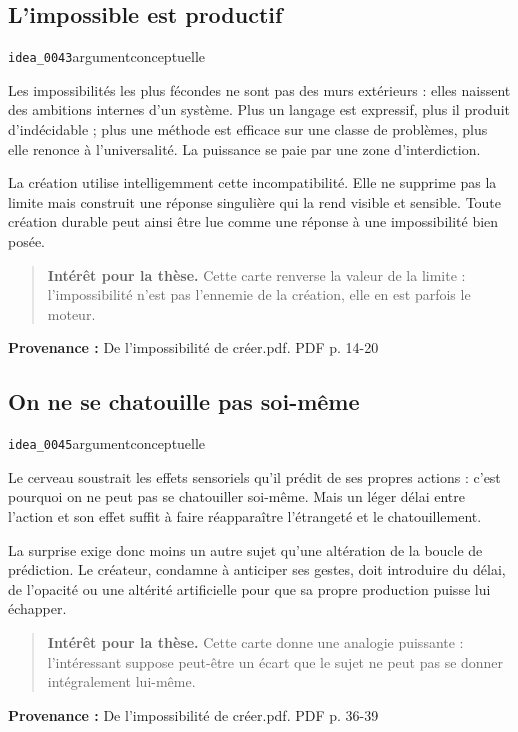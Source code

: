 \documentclass[10pt,a4paper]{article}
\begin{document}
\subsection{L'impossible est productif}
{\small\color{metadata} \texttt{idea\_0043}\quad\textbullet\quad argument\quad\textbullet\quad conceptuelle\par}

Les impossibilités les plus fécondes ne sont pas des murs extérieurs : elles naissent des ambitions internes d'un système. Plus un langage est expressif, plus il produit d'indécidable ; plus une méthode est efficace sur une classe de problèmes, plus elle renonce à l'universalité. La puissance se paie par une zone d'interdiction.

La création utilise intelligemment cette incompatibilité. Elle ne supprime pas la limite mais construit une réponse singulière qui la rend visible et sensible. Toute création durable peut ainsi être lue comme une réponse à une impossibilité bien posée.

\begin{quote}
\textbf{Intérêt pour la thèse.} Cette carte renverse la valeur de la limite : l'impossibilité n'est pas l'ennemie de la création, elle en est parfois le moteur.
\end{quote}
{\footnotesize\color{metadata}\textbf{Provenance :} De l'impossibilité de créer.pdf. PDF p. 14-20\par}

\subsection{On ne se chatouille pas soi-même}
{\small\color{metadata} \texttt{idea\_0045}\quad\textbullet\quad argument\quad\textbullet\quad conceptuelle\par}

Le cerveau soustrait les effets sensoriels qu'il prédit de ses propres actions : c'est pourquoi on ne peut pas se chatouiller soi-même. Mais un léger délai entre l'action et son effet suffit à faire réapparaître l'étrangeté et le chatouillement.

La surprise exige donc moins un autre sujet qu'une altération de la boucle de prédiction. Le créateur, condamne à anticiper ses gestes, doit introduire du délai, de l'opacité ou une altérité artificielle pour que sa propre production puisse lui échapper.

\begin{quote}
\textbf{Intérêt pour la thèse.} Cette carte donne une analogie puissante : l'intéressant suppose peut-être un écart que le sujet ne peut pas se donner intégralement lui-même.
\end{quote}
{\footnotesize\color{metadata}\textbf{Provenance :} De l'impossibilité de créer.pdf. PDF p. 36-39\par}
\end{document}

